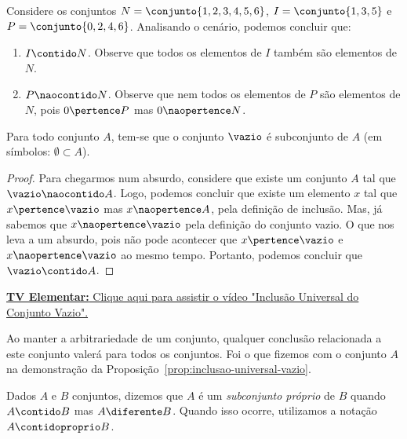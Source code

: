 \begin{example}
	Considere os conjuntos $N = \conjunto{1, 2, 3, 4, 5, 6}$, $I = \conjunto{1, 3, 5}$ e $P = \conjunto{0, 2, 4, 6}$. Analisando o cenário, podemos concluir que:
	\begin{enumerate}
		\item $I \contido N$. Observe que todos os elementos de $I$ também são elementos de $N$.
		\item $P \naocontido N$. Observe que nem todos os elementos de $P$ são elementos de $N$, pois $0 \pertence P$ mas $0 \naopertence N$.
	\end{enumerate}
\end{example}

\begin{proposition}
	\label{prop:inclusao-universal-vazio}
	Para todo conjunto $A$, tem-se que o conjunto $\vazio$ é subconjunto de $A$ (em símbolos: $\emptyset \subset A$).
\end{proposition}

\begin{proof}
	Para chegarmos num absurdo, considere que existe um conjunto $A$ tal que $\vazio \naocontido A$. Logo, podemos concluir que existe um elemento $x$ tal que $x \pertence \vazio$ mas $x \naopertence A$, pela definição de inclusão. Mas, já sabemos que $x \naopertence \vazio$ pela definição do conjunto vazio. O que nos leva a um absurdo, pois não pode acontecer que $x \pertence \vazio$ e $x \naopertence \vazio$ ao mesmo tempo. Portanto, podemos concluir que $\vazio \contido A$.
\end{proof}


\href{https://drive.google.com/file/d/1HNQSdhNUYXp0OVWvWz2OwhN5AbgH8LX-/view?usp=sharing}{\textbf{TV Elementar:} Clique aqui para assistir o vídeo "Inclusão Universal do Conjunto Vazio".}

\begin{remark}
	Ao manter a arbitrariedade de um conjunto, qualquer conclusão relacionada a este conjunto valerá para todos os conjuntos. Foi o que fizemos com o conjunto $A$ na demonstração da Proposição~\ref{prop:inclusao-universal-vazio}.
\end{remark}

\begin{definition}
	Dados $A$ e $B$ conjuntos, dizemos que $A$ é um \emph{subconjunto próprio} de $B$ quando $A \contido B$ mas $A \diferente B$. Quando isso ocorre, utilizamos a notação $A \contidoproprio B$.
\end{definition}

